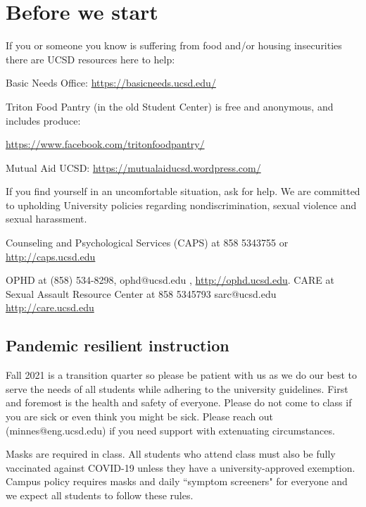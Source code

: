 \documentclass[12pt, oneside]{article}
\begin{document}
\begin{flushright}
\end{flushright} 
\section*{Before we start}
If you or someone you know is suffering from food and/or housing insecurities 
there are UCSD resources here to help:

Basic Needs Office: \href{https://basicneeds.ucsd.edu/}{https://basicneeds.ucsd.edu/}

Triton Food Pantry (in the old Student Center)
is free and anonymous, and includes produce: 

\href{https://www.facebook.com/tritonfoodpantry/}{https://www.facebook.com/tritonfoodpantry/}

Mutual Aid UCSD: \href{https://mutualaiducsd.wordpress.com/}{https://mutualaiducsd.wordpress.com/}

If you find yourself in an uncomfortable situation, ask for help. 
We are committed to upholding University policies regarding nondiscrimination, sexual violence and sexual harassment.

Counseling and Psychological Services (CAPS) at 858 5343755 or \href{http://caps.ucsd.edu}{http://caps.ucsd.edu}


OPHD at (858) 534-8298, ophd@ucsd.edu , \href{http://ophd.ucsd.edu}{http://ophd.ucsd.edu}. 
CARE at Sexual Assault Resource Center at 858 5345793 sarc@ucsd.edu \href{http://care.ucsd.edu}{http://care.ucsd.edu}

\subsection*{Pandemic resilient instruction}
Fall 2021 is a transition quarter so please be patient with us as we do our best 
to serve the needs of all students while adhering to the university guidelines. 
First and foremost is the health and safety of everyone.  
Please do not come to class if you are sick or even think you might be sick.
Please reach out (minnes@eng.ucsd.edu) if you need support with extenuating circumstances.

Masks are required in class. All students who attend class must also be fully vaccinated against COVID-19
unless they have a university-approved exemption.
Campus policy requires masks and daily ``symptom screeners" for everyone and we expect all students 
to follow these rules. 
\end{document}
